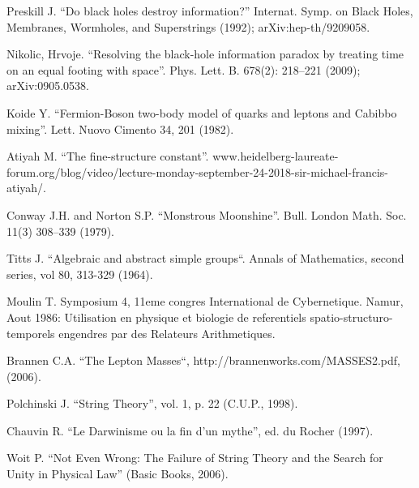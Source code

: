 \documentclass[twoside,draft]{article}
\begin{document}
\begin{sloppypar}
\begin{thebibliography}{99}
 Preskill J. ``Do black holes destroy information?'' Internat.
Symp. on Black Holes, Membranes, Wormholes, and Superstrings (1992);
arXiv:hep-th/9209058.

 Nikolic, Hrvoje. ``Resolving the black-hole information paradox by
treating time on an equal footing with space''. Phys. Lett. B. 678(2):
218--221 (2009); arXiv:0905.0538.

 Koide Y. ``Fermion-Boson two-body model of quarks and leptons and
Cabibbo mixing''.  Lett. Nuovo Cimento 34, 201 (1982).

 Atiyah M. ``The fine-structure constant''. www.heidelberg-laureate-forum.org/blog/video/lecture-monday-september-24-2018-sir-michael-francis-atiyah/.

 Conway J.H. and Norton S.P. ``Monstrous Moonshine''. Bull. London
Math. Soc. 11(3) 308--339 (1979).

 Titts J. ``Algebraic and abstract simple groups``. Annals of Mathematics, second series, vol 80, 313-329 (1964).



 Moulin T. Symposium 4, 11eme congres International de Cybernetique. Namur, Aout 1986: Utilisation en physique et biologie de referentiels spatio-structuro-temporels engendres par des Relateurs Arithmetiques. 

 Brannen C.A. ``The Lepton Masses``, http://brannenworks.com/MASSES2.pdf, (2006).

 Polchinski J. ``String Theory'', vol. 1, p. 22 (C.U.P., 1998).

 Chauvin R. ``Le Darwinisme ou la fin d'un mythe'', ed. du Rocher
(1997).

 Woit P. ``Not Even Wrong: The Failure of String Theory and the
Search for Unity in Physical Law'' (Basic Books, 2006).


\end{thebibliography}
\end{sloppypar}
\end{document}
